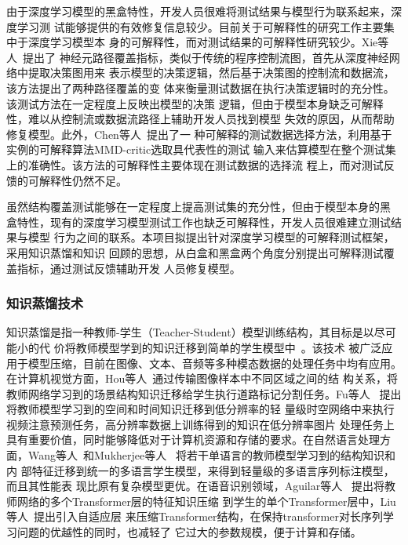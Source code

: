 由于深度学习模型的黑盒特性，开发人员很难将测试结果与模型行为联系起来，深度学习测
试能够提供的有效修复信息较少。目前关于可解释性的研究工作主要集中于深度学习模型本
身的可解释性，而对测试结果的可解释性研究较少。Xie等人~提出了
神经元路径覆盖指标，类似于传统的程序控制流图，首先从深度神经网络中提取决策图用来
表示模型的决策逻辑，然后基于决策图的控制流和数据流，该方法提出了两种路径覆盖的变
体来衡量测试数据在执行决策逻辑时的充分性。该测试方法在一定程度上反映出模型的决策
逻辑，但由于模型本身缺乏可解释性，难以从控制流或数据流路径上辅助开发人员找到模型
失效的原因，从而帮助修复模型。此外，Chen等人~提出了一
种可解释的测试数据选择方法，利用基于实例的可解释算法MMD-critic选取具代表性的测试
输入来估算模型在整个测试集上的准确性。该方法的可解释性主要体现在测试数据的选择流
程上，而对测试反馈的可解释性仍然不足。

{\kaishu 虽然结构覆盖测试能够在一定程度上提高测试集的充分性，但由于模型本身的黑
盒特性，现有的深度学习模型测试工作也缺乏可解释性，开发人员很难建立测试结果与模型
行为之间的联系。本项目拟提出针对深度学习模型的可解释测试框架，采用知识蒸馏和知识
回顾的思想，从白盒和黑盒两个角度分别提出可解释测试覆盖指标，通过测试反馈辅助开发
人员修复模型。}




\subsubsection{知识蒸馏技术}

知识蒸馏是指一种教师-学生（Teacher-Student）模型训练结构，其目标是以尽可能小的代
价将教师模型学到的知识迁移到简单的学生模型中~。该技术
被广泛应用于模型压缩，目前在图像、文本、音频等多种模态数据的处理任务中均有应用。
在计算机视觉方面，Hou等人~通过传输图像样本中不同区域之间的结
构关系，将教师网络学习到的场景结构知识迁移给学生执行道路标记分割任务。Fu等人
~提出将教师模型学习到的空间和时间知识迁移到低分辨率的轻
量级时空网络中来执行视频注意预测任务，高分辨率数据上训练得到的知识在低分辨率图片
处理任务上具有重要价值，同时能够降低对于计算机资源和存储的要求。在自然语言处理方
面，Wang等人~和Mukherjee等人
~将若干单语言的教师模型学习到的结构知识和内
部特征迁移到统一的多语言学生模型，来得到轻量级的多语言序列标注模型，而且其性能表
现比原有复杂模型更优。在语音识别领域，Aguilar等人
~提出将教师网络的多个Transformer层的特征知识压缩
到学生的单个Transformer层中，Liu等人~提出引入自适应层
来压缩Transformer结构，在保持transformer对长序列学习问题的优越性的同时，也减轻了
它过大的参数规模，便于计算和存储。

